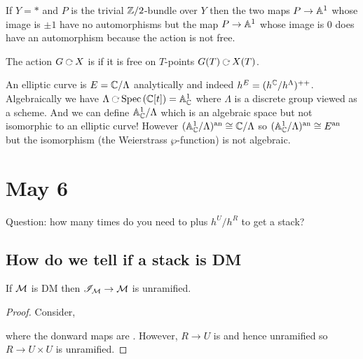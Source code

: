 \documentclass[12pt]{article}
\begin{document}
\begin{example}
If $Y = *$ and $P$ is the trivial $\mathbb{Z}/2$-bundle over $Y$ then the two maps $P \to \mathbb{A}^1$ whose image is $\pm 1$ have no automorphisms but the map $P \to \mathbb{A}^1$ whose image is $0$ does have an automorphism because the action is not free. 
\end{example}

\begin{defn}
The action $G \acts X$ is  if it is free on $T$-points $G(T) \acts X(T)$.
\end{defn}

\begin{example}
An elliptic curve is $E = \mathbb{C} / \Lambda$ analytically and indeed $h^E = (h^{\mathbb{C}} / h^\Lambda)^{++}$. Algebraically we have $\Lambda \acts \Spec{\CC[t]} = \A^1_{\CC}$ where $\Lambda$ is a discrete group viewed as a scheme. And we can define $\mathbb{A}^1_{\mathbb{C}} / \Lambda$ which is an algebraic space but not isomorphic to an elliptic curve! However $(\mathbb{A}^1_{\mathbb{C}} / \Lambda)^{\mathrm{an}} \cong \mathbb{C} / \Lambda$ so $(\mathbb{A}^1_{\mathbb{C}} / \Lambda)^{\mathrm{an}} \cong E^{\mathrm{an}}$ but the isomorphism (the Weierstrass $\wp$-function) is not algebraic. 
\end{example}

\section{May 6}

Question: how many times do you need to plus $h^U / h^R$ to get a stack? 

\subsection{How do we tell if a stack is DM}

\begin{prop}
If $\mathcal{M}$ is DM then $\mathscr{I}_{\mathcal{M}} \to \mathcal{M}$ is unramified. 
\end{prop}

\begin{proof}
Consider,
\begin{center}
\end{center}
where the donward maps are \etale. However, $R \to U$ is \etale and hence unramified so $R \to U \times U$ is unramified. 
\end{proof}
\end{document}
